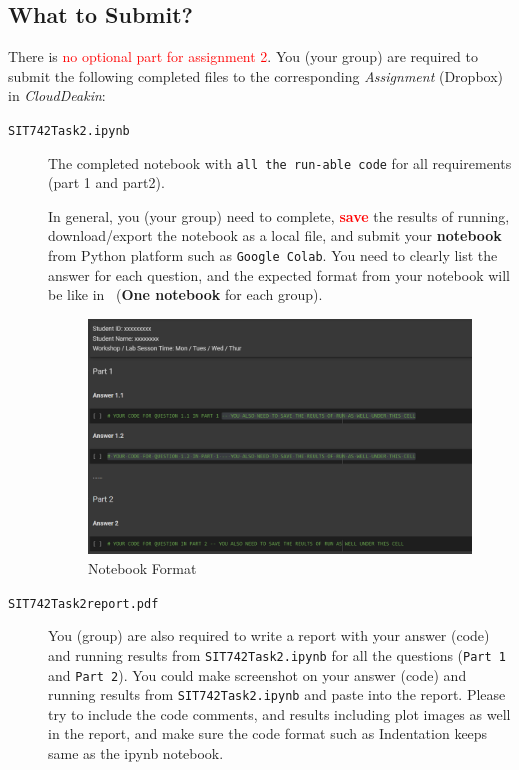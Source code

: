 \documentclass[a4paper]{article}
\begin{document}
    
\subsection*{What to Submit?}\label{sec:submit}

There is \textcolor{red}{no optional part for assignment 2}.
You (your group) are required to 
submit the following completed files to 
the corresponding \emph{Assignment} (Dropbox) in \emph{CloudDeakin}:
\begin{description} 
\item[\texttt{SIT742Task2.ipynb}] 
The completed notebook with \texttt{all the run-able code} for all requirements (part 1 and part2).

In general, 
you (your group) need to complete, 
\textcolor{red}{\textbf{save}} the results of running, 
download/export the notebook as a local file,
and submit your \textbf{notebook} 
from Python platform such as \texttt{Google Colab}. 
You need to clearly list the answer for each question,
and the expected format from your notebook will 
be like in~ (\textbf{One notebook} for each group).

\begin{figure}[H]
    \centering
    \includegraphics[width=0.99\columnwidth]{figure/assigment1.png}
    \caption{Notebook Format}
    \label{fig:format}
\end{figure}
    

\item[\texttt{SIT742Task2report.pdf}] 
You (group) are also required to write a report with 
your answer (code) and running results from \texttt{SIT742Task2.ipynb} for all the questions (\texttt{Part 1} and \texttt{Part 2}).
You could make screenshot on your answer (code) and running results from \texttt{SIT742Task2.ipynb} and paste into the report.
Please try to include the code comments, and results including plot images as well in the report,
and make sure
the code format such as Indentation keeps same as the ipynb notebook. 


\end{description}
\end{document}
